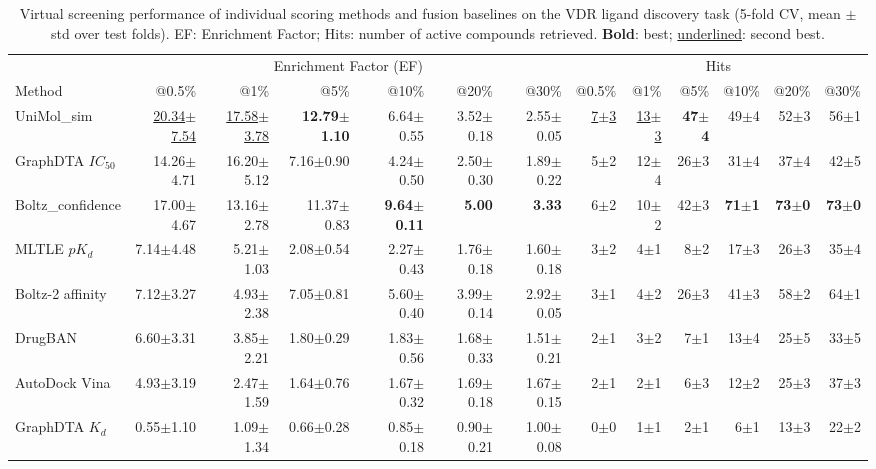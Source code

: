 \begin{table}[htbp!]
\centering
\caption{Virtual screening performance of individual scoring methods and fusion baselines on the VDR ligand discovery task (5-fold CV, mean $\pm$ std over test folds). EF: Enrichment Factor; Hits: number of active compounds retrieved. \textbf{Bold}: best; \underline{underlined}: second best.}
\label{tab:fusion_performance}
\small
\begin{tabular}{lrrrrrr|rrrrrr}
\toprule
& \multicolumn{6}{c|}{Enrichment Factor (EF)} & \multicolumn{6}{c}{Hits} \\
Method & @0.5\% & @1\% & @5\% & @10\% & @20\% & @30\% & @0.5\% & @1\% & @5\% & @10\% & @20\% & @30\% \\
\midrule
UniMol_sim & \underline{20.34$\pm$7.54} & \underline{17.58$\pm$3.78} & \textbf{12.79$\pm$1.10} & 6.64$\pm$0.55 & 3.52$\pm$0.18 & 2.55$\pm$0.05 & \underline{7$\pm$3} & \underline{13$\pm$3} & \textbf{47$\pm$4} & 49$\pm$4 & 52$\pm$3 & 56$\pm$1 \\
GraphDTA $IC_{50}$ & 14.26$\pm$4.71 & 16.20$\pm$5.12 & 7.16$\pm$0.90 & 4.24$\pm$0.50 & 2.50$\pm$0.30 & 1.89$\pm$0.22 & 5$\pm$2 & 12$\pm$4 & 26$\pm$3 & 31$\pm$4 & 37$\pm$4 & 42$\pm$5 \\
Boltz_confidence & 17.00$\pm$4.67 & 13.16$\pm$2.78 & 11.37$\pm$0.83 & \textbf{9.64$\pm$0.11} & \textbf{5.00} & \textbf{3.33} & 6$\pm$2 & 10$\pm$2 & 42$\pm$3 & \textbf{71$\pm$1} & \textbf{73$\pm$0} & \textbf{73$\pm$0} \\
MLTLE $pK_d$ & 7.14$\pm$4.48 & 5.21$\pm$1.03 & 2.08$\pm$0.54 & 2.27$\pm$0.43 & 1.76$\pm$0.18 & 1.60$\pm$0.18 & 3$\pm$2 & 4$\pm$1 & 8$\pm$2 & 17$\pm$3 & 26$\pm$3 & 35$\pm$4 \\
Boltz-2 affinity & 7.12$\pm$3.27 & 4.93$\pm$2.38 & 7.05$\pm$0.81 & 5.60$\pm$0.40 & 3.99$\pm$0.14 & 2.92$\pm$0.05 & 3$\pm$1 & 4$\pm$2 & 26$\pm$3 & 41$\pm$3 & 58$\pm$2 & 64$\pm$1 \\
DrugBAN & 6.60$\pm$3.31 & 3.85$\pm$2.21 & 1.80$\pm$0.29 & 1.83$\pm$0.56 & 1.68$\pm$0.33 & 1.51$\pm$0.21 & 2$\pm$1 & 3$\pm$2 & 7$\pm$1 & 13$\pm$4 & 25$\pm$5 & 33$\pm$5 \\
AutoDock Vina & 4.93$\pm$3.19 & 2.47$\pm$1.59 & 1.64$\pm$0.76 & 1.67$\pm$0.32 & 1.69$\pm$0.18 & 1.67$\pm$0.15 & 2$\pm$1 & 2$\pm$1 & 6$\pm$3 & 12$\pm$2 & 25$\pm$3 & 37$\pm$3 \\
GraphDTA $K_{d}$ & 0.55$\pm$1.10 & 1.09$\pm$1.34 & 0.66$\pm$0.28 & 0.85$\pm$0.18 & 0.90$\pm$0.21 & 1.00$\pm$0.08 & 0$\pm$0 & 1$\pm$1 & 2$\pm$1 & 6$\pm$1 & 13$\pm$3 & 22$\pm$2 \\

\end{tabular}
\end{table}

